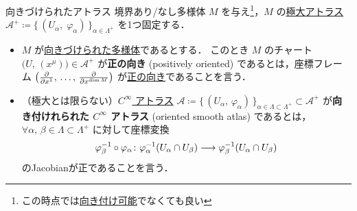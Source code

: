 \documentclass[geometry_main]{subfiles}
\begin{document}
\begin{mydef}[label=def:atlas-oriented]{向きづけられたアトラス}
	境界あり/なし多様体 $M$ を与え\footnote{この時点では\hyperref[def:smooth-orientation]{向き付け可能}でなくても良い}，$M$ の\hyperref[maxatlas]{極大アトラス} $\mathcal{A}^+ \coloneqq \bigl\{\, (U_\alpha,\; \varphi_\alpha)  \,\bigr\}_{\alpha \in \Lambda^+}$ を1つ固定する．

	\begin{itemize}
		\item $M$ が\hyperref[def:smooth-orientation]{向きづけられた多様体}であるとする．
		このとき $M$ のチャート $\bigl(U,\, (x^\mu)\bigr) \in \mathcal{A}^+$ が\textbf{正の向き} (positively oriented) であるとは，座標フレーム $\bigl( \pdv{}{x^1},\, \dots,\, \pdv{}{x^{\dim M}} \bigr)$ が\hyperref[def:smooth-orientation]{正の向き}であることを言う．
		\item （極大とは限らない）\hyperref[diffmani]{$C^\infty$ アトラス} $\mathcal{A} \coloneqq \bigl\{\, (U_\alpha,\, \varphi_\alpha) \,\bigr\}_{\alpha \in \Lambda \subset \Lambda^+}  \subset \mathcal{A}^+$ が\textbf{向き付けれられた $C^\infty$ アトラス} (oriented smooth atlas) であるとは，
		$\forall \alpha,\, \beta \in \Lambda \subset \Lambda^+$ に対して座標変換
		\begin{align}
			\varphi_\beta^{-1} \circ \varphi_\alpha \colon \varphi_\alpha^{-1} (U_\alpha \cap U_\beta) \longrightarrow \varphi_\beta^{-1}(U_\alpha \cap U_\beta)
		\end{align}
		のJacobianが正であることを言う．
	\end{itemize}
\end{mydef}
\end{document}
